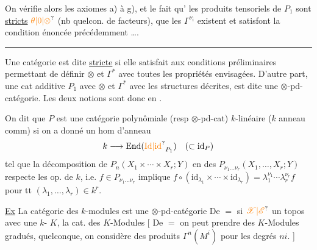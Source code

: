 On vérifie alors les axiomes
a) à g), et le fait qu'
les produits tensoriels de $P_1$
sont \uline{stricts}  $\unsure{\theta|0|\otimes}$ (nb quelcon. de
facteurs), que les $\Gamma^{\nu_i}$ existent et
satisfont la condition énoncée précédemment \dots.

\medskip\noindent\hfil\rule{4cm}{0.4pt}\hfil\par

Une catégorie   est dite
\uline{stricte} si elle satisfait aux
conditions préliminaires permettant
de définir $\otimes$ et $\Gamma^*$ avec toutes les
propriétés envisagées. D'autre part,
une cat additive $P_{1}$ avec $\otimes$ et $\Gamma^*$
avec les structures décrites, est
dite une $\otimes$-pd-catégorie. Les
deux notions sont donc en .

On dit que $P$ est  une
catégorie polynômiale (resp $\otimes$-pd-cat)
$k$-linéaire ($k$ anneau comm)
si on a donné un hom d'anneau
\[
k\longrightarrow\operatorname{End}(\unsure{\mathrm{Id}|\mathrm{id}}_{P_1})\quad(\subset\mathrm{id}_P)
\]
tel que la décomposition de
$P_n(X_1\times\cdots\times X_r;Y)$ en des $P_{\nu_1\ldots\nu_r}(X_1,\ldots,X_r;Y)$
respecte les op. de $k$, i.e. $f\in P_{\nu_1\ldots\nu_r}$
implique $f\circ(\mathrm{id}_{\lambda_1}\times\cdots\times\mathrm{id}_{\lambda_r})=\lambda_1^{\nu_1}\cdots\lambda_r^{\nu_r}f$
pour tt $(\lambda_1,\ldots,\lambda_r)\in k^r$.

\medskip\noindent\hfil\shortstack[r]{\rule{3cm}{0.4pt}\\[-0.9ex]\rule{0.9cm}{0.4pt}}\hfil\par

\uline{Ex} La catégorie des $k$-modules
est une $\otimes$-pd-catégorie
De $=$ si $\unsure{\mathscr X|\mathscr E}$ un topos avec une
$k$- $K$, la cat. des $K$-Modules
 [ De $=$ on peut prendre des
$K$-Modules gradués,  
quelconque,  on considère des
produits $\Gamma^n(M^i)$ pour les degrés $ni$. ]

\medskip\noindent\hfil\shortstack[r]{\rule{3cm}{0.4pt}\\[-0.9ex]\rule{0.9cm}{0.4pt}}\hfil\par

